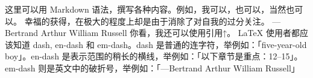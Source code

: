 \markdownRendererInterblockSeparator
{}这里可以用 Markdown 语法，撰写各种内容。例如，我可以，也可以，当然也可以。\markdownRendererInterblockSeparator
{}\markdownRendererInterblockSeparator
{}\markdownRendererBlockQuoteBegin
幸福的获得，在极大的程度上却是由于消除了对自我的过分关注。 ---Bertrand Arthur William Russell
\markdownRendererBlockQuoteEnd \markdownRendererInterblockSeparator
{}你看，我还可以使用引用↑。\markdownRendererInterblockSeparator
{}\markdownRendererInterblockSeparator
{}LaTeX 使用者都应该知道 dash, en-dash 和 em-dash。dash 是普通的连字符，举例如：「five-year-old boy」。en-dash 是表示范围的稍长的横线，举例如：「以下章节是重点：12--15」。em-dash 则是英文中的破折号，举例如：「---Bertrand Arthur William Russell」\relax